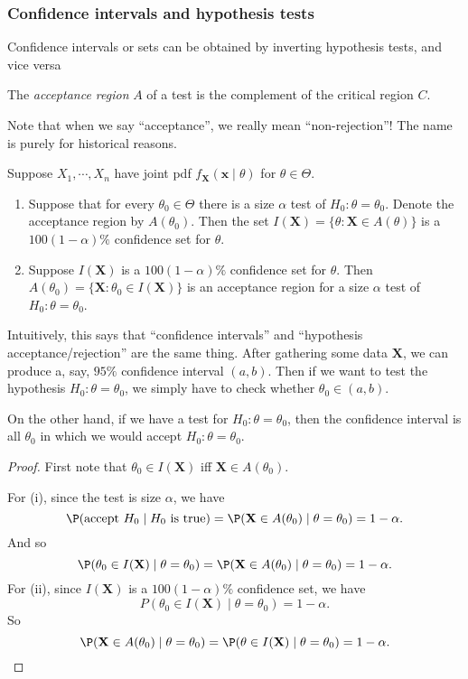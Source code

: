 \documentclass[a4paper]{article}
\begin{document}
\subsubsection{Confidence intervals and hypothesis tests}
Confidence intervals or sets can be obtained by inverting hypothesis tests, and vice versa

\begin{defi}
  The \emph{acceptance region} $A$ of a test is the complement of the critical region $C$.

  Note that when we say ``acceptance'', we really mean ``non-rejection''! The name is purely for historical reasons.
\end{defi}
\begin{thm}\leavevmode
    Suppose $X_1, \cdots, X_n$ have joint pdf $f_\mathbf{X}(\mathbf{x}\mid \theta)$ for $\theta\in \Theta$.
  \begin{enumerate}
    \item Suppose that for every $\theta_0\in \Theta$ there is a size $\alpha$ test of $H_0: \theta = \theta_0$. Denote the acceptance region by $A(\theta_0)$. Then the set $I(\mathbf{X}) = \{\theta:\mathbf{X}\in A(\theta)\}$ is a $100(1 - \alpha)\%$ confidence set for $\theta$.
    \item Suppose $I(\mathbf{X})$ is a $100(1 - \alpha)\%$ confidence set for $\theta$. Then $A(\theta_0) = \{\mathbf{X}: \theta_0 \in I(\mathbf{X})\}$ is an acceptance region for a size $\alpha$ test of $H_0: \theta = \theta_0$.
  \end{enumerate}
\end{thm}
Intuitively, this says that ``confidence intervals'' and ``hypothesis acceptance/rejection'' are the same thing. After gathering some data $\mathbf{X}$, we can produce a, say, $95\%$ confidence interval $(a, b)$. Then if we want to test the hypothesis $H_0: \theta = \theta_0$, we simply have to check whether $\theta_0 \in (a, b)$.

On the other hand, if we have a test for $H_0: \theta = \theta_0$, then the confidence interval is all $\theta_0$ in which we would accept $H_0: \theta = \theta_0$.
\begin{proof}
  First note that $\theta_0\in I(\mathbf{X})$ iff $\mathbf{X}\in A(\theta_0)$.

  For (i), since the test is size $\alpha$, we have
  \[
    \P(\text{accept }H_0\mid H_0\text{ is true}) = \P(\mathbf{X}\in A
    (\theta_0)\mid \theta=\theta_0) = 1 - \alpha.
  \]
  And so
  \[
    \P(\theta_0\in I(\mathbf{X})\mid \theta = \theta_0) = \P(\mathbf{X}\in A(\theta_0)\mid \theta = \theta_0) = 1 - \alpha.
  \]
  For (ii), since $I(\mathbf{X})$ is a $100(1 - \alpha)\%$ confidence set, we have
  \[
    P(\theta_0\in I(\mathbf{X})\mid \theta = \theta_0) = 1- \alpha.
  \]
  So
  \[
    \P(\mathbf{X}\in A(\theta_0)\mid \theta = \theta_0) = \P(\theta\in I(\mathbf{X})\mid \theta = \theta_0) = 1- \alpha.\qedhere
  \]
\end{proof}
\end{document}
